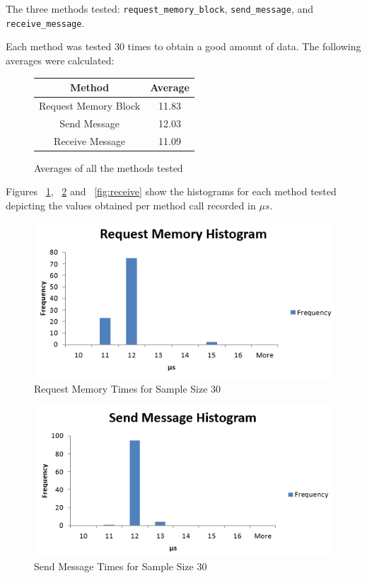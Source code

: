 \documentclass[se]{uw-wkrpt}
\begin{document}
The three methods tested: \texttt{request\_memory\_block}, \texttt{send\_message}, and \texttt{receive\_message}. 

Each method was tested 30 times to obtain a good amount of data. 
The following averages were calculated:
\begin{figure}
\begin{center}
\begin{tabular}{|c|c|}
\hline
Method & Average\\
\hline
Request Memory Block & 11.83 \\
\hline
Send Message & 12.03 \\
\hline
Receive Message & 11.09\\
\hline
\end{tabular}
\end{center}
\caption{Averages of all the methods tested}
\end{figure}

Figures ~\ref{fig:mem}, ~\ref{fig:send} and ~\ref{fig:receive} show the histograms for each method tested depicting the values obtained per method call recorded in $\mu s$.

\begin{figure}[bp!]
\centering
\includegraphics[width=120mm]{RequestMemoryHistogram.PNG}
\caption{Request Memory Times for Sample Size 30}
\label{fig:mem}
\end{figure}

\begin{figure}[bp!]
\centering
\includegraphics[width=120mm]{SendMessageHistogram.PNG}
\caption{Send Message Times for Sample Size 30}
\label{fig:send}
\end{figure}
\end{document}
